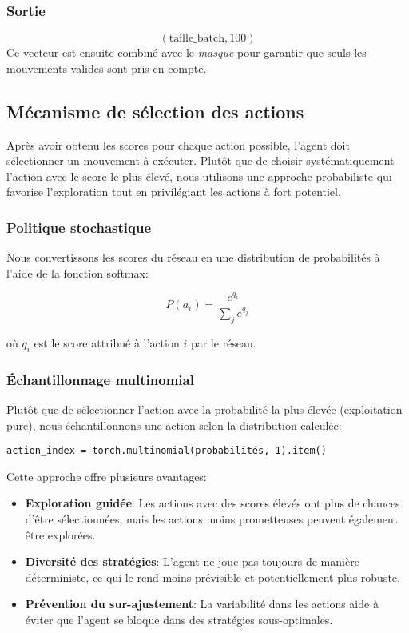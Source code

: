 \documentclass[]{article}
\begin{document}
\subsubsection{Sortie}
\[
(\text{taille\_batch}, 100)
\]
Ce vecteur est ensuite combiné avec le \textit{masque} pour garantir que seuls les mouvements valides sont pris en compte.

\subsection{Mécanisme de sélection des actions}
Après avoir obtenu les scores pour chaque action possible, l'agent doit sélectionner un mouvement à exécuter. Plutôt que de choisir systématiquement l'action avec le score le plus élevé, nous utilisons une approche probabiliste qui favorise l'exploration tout en privilégiant les actions à fort potentiel.

\subsubsection{Politique stochastique}
Nous convertissons les scores du réseau en une distribution de probabilités à l'aide de la fonction softmax:

\[
P(a_i) = \frac{e^{q_i}}{\sum_j e^{q_j}}
\]

où \(q_i\) est le score attribué à l'action \(i\) par le réseau.

\subsubsection{Échantillonnage multinomial}
Plutôt que de sélectionner l'action avec la probabilité la plus élevée (exploitation pure), nous échantillonnons une action selon la distribution calculée:

\begin{verbatim}
action_index = torch.multinomial(probabilités, 1).item()
\end{verbatim}

Cette approche offre plusieurs avantages:
\begin{itemize}
    \item \textbf{Exploration guidée}: Les actions avec des scores élevés ont plus de chances d'être sélectionnées, mais les actions moins prometteuses peuvent également être explorées.
    \item \textbf{Diversité des stratégies}: L'agent ne joue pas toujours de manière déterministe, ce qui le rend moins prévisible et potentiellement plus robuste.
    \item \textbf{Prévention du sur-ajustement}: La variabilité dans les actions aide à éviter que l'agent se bloque dans des stratégies sous-optimales.
\end{itemize}
\end{document}

